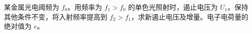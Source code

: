 某金属光电阈频为 $f_0$。用频率为 $f_1>f_0$ 的单色光照射时，遏止电压为 $U_1$。保持其他条件不变，将入射频率提高到 $f_2>f_1$，求新遏止电压及增量。电子电荷量的绝对值为 $e$。
